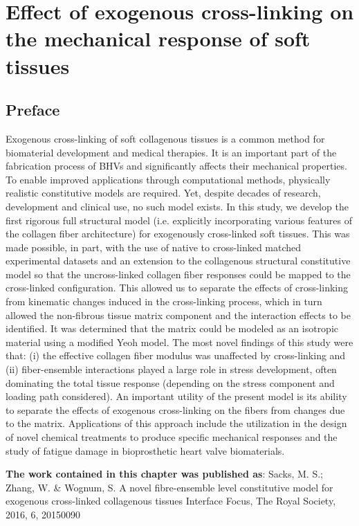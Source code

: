 \chapter{Effect of exogenous cross-linking on the mechanical response of soft tissues}


\section*{Preface}
%

    Exogenous cross-linking of soft collagenous tissues is a common method for biomaterial development and medical therapies. It is an important part of the fabrication process of BHVs and significantly affects their mechanical properties. To enable improved applications through computational methods, physically realistic constitutive models are required. Yet, despite decades of research, development and clinical use, no such model exists. In this study, we develop the first rigorous full structural model (i.e. explicitly incorporating various features of the collagen fiber architecture) for exogenously cross-linked soft tissues. This was made possible, in part, with the use of native to cross-linked matched experimental datasets and an extension to the collagenous structural constitutive model so that the uncross-linked collagen fiber responses could be mapped to the cross-linked configuration. This allowed us to separate the effects of cross-linking from kinematic changes induced in the cross-linking process, which in turn allowed the non-fibrous tissue matrix component and the interaction effects to be identified. It was determined that the matrix could be modeled as an isotropic material using a modified Yeoh model. The most novel findings of this study were that: (i) the effective collagen fiber modulus was unaffected by cross-linking and (ii) fiber-ensemble interactions played a large role in stress development, often dominating the total tissue response (depending on the stress component and loading path considered). An important utility of the present model is its ability to separate the effects of exogenous cross-linking on the fibers from changes due to the matrix. Applications of this approach include the utilization in the design of novel chemical treatments to produce specific mechanical responses and the study of fatigue damage in bioprosthetic heart valve biomaterials.

\textbf{The work contained in this chapter was published as}:  Sacks, M. S.; Zhang, W. \& Wognum, S.
A novel fibre-ensemble level constitutive model for exogenous cross-linked collagenous tissues 
Interface Focus, The Royal Society, 2016, 6, 20150090 



